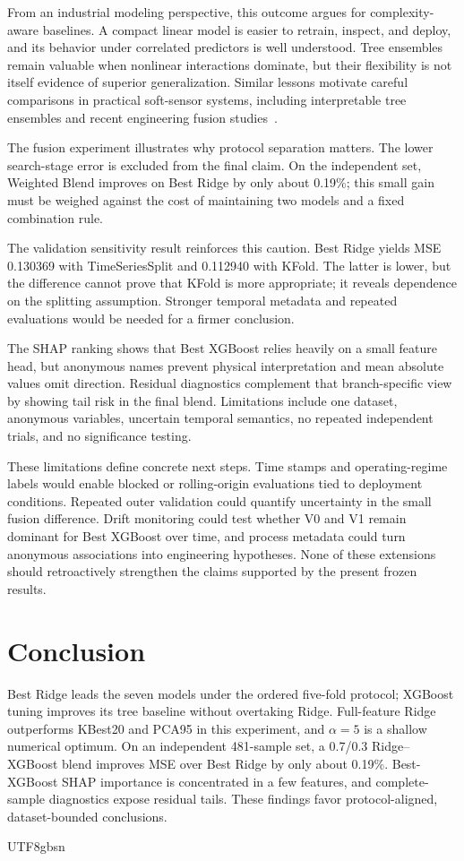 \documentclass[sigconf,screen,review,anonymous]{acmart}
\begin{document}
From an industrial modeling perspective, this outcome argues for complexity-aware baselines. A compact linear model is easier to retrain, inspect, and deploy, and its behavior under correlated predictors is well understood. Tree ensembles remain valuable when nonlinear interactions dominate, but their flexibility is not itself evidence of superior generalization. Similar lessons motivate careful comparisons in practical soft-sensor systems, including interpretable tree ensembles and recent engineering fusion studies~\cite{cao2023interpretable_softsensor,chen2023zju_xgboost_shap,hu2025zju_stacking}.

The fusion experiment illustrates why protocol separation matters. The lower search-stage error is excluded from the final claim. On the independent set, Weighted Blend improves on Best Ridge by only about 0.19\%; this small gain must be weighed against the cost of maintaining two models and a fixed combination rule.

\FloatBarrier

The validation sensitivity result reinforces this caution. Best Ridge yields MSE 0.130369 with TimeSeriesSplit and 0.112940 with KFold. The latter is lower, but the difference cannot prove that KFold is more appropriate; it reveals dependence on the splitting assumption. Stronger temporal metadata and repeated evaluations would be needed for a firmer conclusion.

The SHAP ranking shows that Best XGBoost relies heavily on a small feature head, but anonymous names prevent physical interpretation and mean absolute values omit direction. Residual diagnostics complement that branch-specific view by showing tail risk in the final blend. Limitations include one dataset, anonymous variables, uncertain temporal semantics, no repeated independent trials, and no significance testing.

These limitations define concrete next steps. Time stamps and operating-regime labels would enable blocked or rolling-origin evaluations tied to deployment conditions. Repeated outer validation could quantify uncertainty in the small fusion difference. Drift monitoring could test whether V0 and V1 remain dominant for Best XGBoost over time, and process metadata could turn anonymous associations into engineering hypotheses. None of these extensions should retroactively strengthen the claims supported by the present frozen results.

\section{Conclusion}
Best Ridge leads the seven models under the ordered five-fold protocol; XGBoost tuning improves its tree baseline without overtaking Ridge. Full-feature Ridge outperforms KBest20 and PCA95 in this experiment, and $\alpha=5$ is a shallow numerical optimum. On an independent 481-sample set, a 0.7/0.3 Ridge--XGBoost blend improves MSE over Best Ridge by only about 0.19\%. Best-XGBoost SHAP importance is concentrated in a few features, and complete-sample diagnostics expose residual tails. These findings favor protocol-aligned, dataset-bounded conclusions.

\begin{CJK*}{UTF8}{gbsn}


\end{CJK*}
\end{document}
